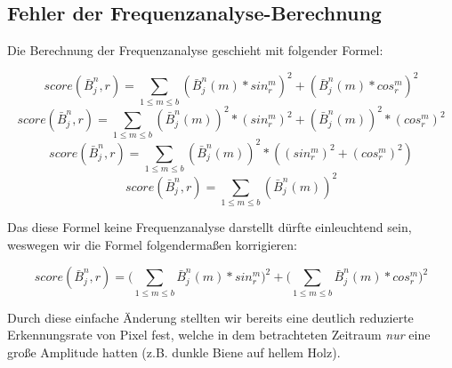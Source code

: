 \documentclass[11pt,a4paper]{article}
\begin{document}
\subsection{Fehler der Frequenzanalyse-Berechnung}
Die Berechnung der Frequenzanalyse geschieht mit folgender Formel:
\begin{center}
\begin{equation} 
score(\bar{B}_j^n, r) = \sum_{1\le m\le b} (\bar{B}_j^n(m) * sin_r^m)^2+(\bar{B}_j^n(m) * cos_r^m)^2
\end{equation}
\begin{equation} 
score(\bar{B}_j^n, r) = \sum_{1\le m\le b} (\bar{B}_j^n(m)) ^2 * (sin_r^m) ^2+(\bar{B}_j^n(m)) ^2 * (cos_r^m) ^2
\end{equation}
\begin{equation} 
score(\bar{B}_j^n, r) = \sum_{1\le m\le b} (\bar{B}_j^n(m)) ^2 * ((sin_r^m) ^2+ (cos_r^m) ^2)
\end{equation}
\begin{equation} 
score(\bar{B}_j^n, r) = \sum_{1\le m\le b} (\bar{B}_j^n(m)) ^2
\end{equation}
\end{center}
Das diese Formel keine Frequenzanalyse darstellt dürfte einleuchtend sein, weswegen wir die Formel folgendermaßen korrigieren:
\begin{center}
\begin{equation} 
score(\bar{B}_j^n, r) = \big(\sum_{1\le m\le b} \bar{B}_j^n(m) * sin_r^m\big)^2 +  \big(\sum_{1\le m\le b} \bar{B}_j^n(m) * cos_r^m\big)^2
\end{equation}
\end{center}
Durch diese einfache Änderung stellten wir bereits eine deutlich reduzierte Erkennungsrate von Pixel fest, welche in dem betrachteten Zeitraum \emph{nur} eine große Amplitude hatten (z.B. dunkle Biene auf hellem Holz).
\end{document}
